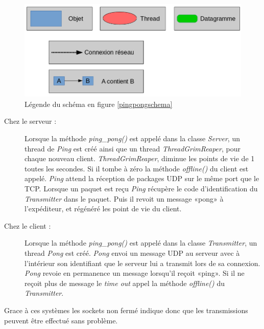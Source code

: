 \documentclass[a4paper,11pt]{report}
\begin{document}
\begin{figure}[th]
      \begin{center}
        \includegraphics[scale=0.3]{Assets/l_r_3.png}
        \caption{Légende du schéma en figure \ref{pingpongschema}}
        \label{pingpongschemalegende}
      \end{center}
\end{figure}


\begin{description}
  \item[Chez le serveur : ]
  Lorsque la méthode \textit{ping\_pong()} est appelé dans la classe \textit{Server}, un thread de \textit{Ping} est créé ainsi que un thread \textit{ThreadGrimReaper}, pour chaque nouveau client. 
\textit{ThreadGrimReaper}, diminue les points de vie de 1 toutes les secondes. Si il tombe à zéro la méthode \textit{offline()} du client est appelé.
\textit{Ping} attend la réception de packages UDP sur le même port que le TCP. Lorsque un paquet est reçu \textit{Ping} récupère le code d’identification du \textit{Transmitter} dans le paquet. Puis il revoit un message «pong» à l’expéditeur, et régénéré les point de vie du client.
  
  \item[Chez le client : ]
  Lorsque la méthode \textit{ping\_pong()} est appelé dans la classe \textit{Transmitter}, un thread \textit{Pong} est créé. \textit{Pong} envoi un message UDP au serveur avec à l’intérieur son identifiant que le serveur lui a transmit lors de sa connexion. \textit{Pong} revoie en permanence un message lorsqu’il reçoit «ping». Si il ne reçoit plus de message le \textit{time out} appel la méthode \textit{offline()} du \textit{Transmitter}.
\end{description}

Grace à ces systèmes les sockets non fermé indique donc que les transmissions peuvent être effectué sans problème.
\end{document}
